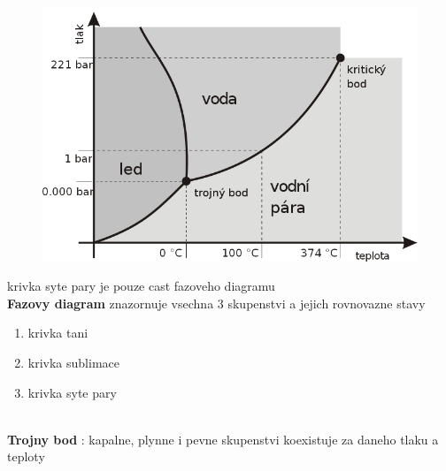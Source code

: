 \documentclass{report}
\begin{document}
\begin{figure}
  \includegraphics[width=\linewidth]{images/Voda-fazovy-diagram.png}
\end{figure}%

krivka syte pary je pouze cast fazoveho diagramu \\[10pt]

\textbf{Fazovy diagram} znazornuje vsechna 3 skupenstvi a jejich rovnovazne stavy \\

\begin{enumerate}
  \item krivka tani
  \item krivka sublimace
  \item krivka syte pary
\end{enumerate}
\ \\
\textbf{Trojny bod} : kapalne, plynne i pevne skupenstvi koexistuje za daneho tlaku a teploty \\

\vspace{20pt}
\end{document}
